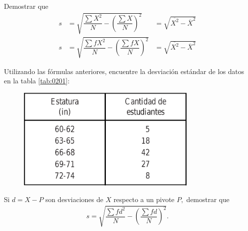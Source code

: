 \begin{problema}
	\label{problema:4.12}
	Demostrar que
	\begin{align}
		s &= \sqrt{\dfrac{\sum X^{2}}{N}-\left( \dfrac{\sum X}{N} \right)^{2}}&=
		\sqrt{\overline{X^{2}}-\overline{X}^{2}}\\
		s &= \sqrt{\dfrac{\sum fX^{2}}{N}-\left( \dfrac{\sum fX}{N} \right)^{2}}&=
		\sqrt{\overline{X^{2}}-\overline{X}^{2}}
	\end{align}
\end{problema}




\begin{problema}
	\label{problema:4.14}
	Utilizando las fórmulas anteriores, encuentre la desviación estándar de los datos en la tabla \ref{tab:0201}:
	\begin{figure}[ht]
		\centering
		\includegraphics[height=5cm,keepaspectratio=true]{./images/tab0201.png}
	\end{figure}
	
\end{problema}




\begin{problema}
	\label{problema:4.15}
	Si $d=X-P$ son desviaciones de $X$ respecto a un pivote $P,$ demostrar que
	\begin{align}
		s=\sqrt{\dfrac{\sum fd^{2}}{N}-\left( \dfrac{\sum fd}{N} \right)^{2}}.
	\end{align}
\end{problema}



